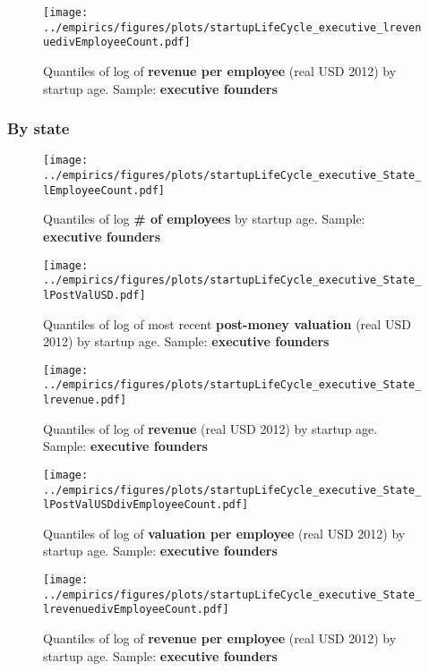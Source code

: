 \documentclass[12pt,english]{article}
\theoremstyle{remark}
\let\Oldsubsubsection\subsubsection
\renewcommand{\subsubsection}{\FloatBarrier\Oldsubsubsection}
\begin{document}
\begin{figure}[!htb]
	\centering
	\texttt{[image: ../empirics/figures/plots/startupLifeCycle\_executive\_lrevenuedivEmployeeCount.pdf]}
	\caption{Quantiles of log of \textbf{revenue per employee} (real USD 2012) by startup age. 
		Sample: \textbf{executive founders}}
\end{figure}

\subsubsection{By state}

\begin{figure}[!htb]
	\centering
	\texttt{[image: ../empirics/figures/plots/startupLifeCycle\_executive\_State\_lEmployeeCount.pdf]}
	\caption{Quantiles of log \textbf{\# of employees} by startup age. 
		Sample: \textbf{executive founders}}
\end{figure}

\begin{figure}[!htb]
	\centering
	\texttt{[image: ../empirics/figures/plots/startupLifeCycle\_executive\_State\_lPostValUSD.pdf]}
	\caption{Quantiles of log of most recent \textbf{post-money valuation} (real USD 2012) by startup age. 
		Sample: \textbf{executive founders}}
\end{figure}

\begin{figure}[!htb]
	\centering
	\texttt{[image: ../empirics/figures/plots/startupLifeCycle\_executive\_State\_lrevenue.pdf]}
	\caption{Quantiles of log of \textbf{revenue} (real USD 2012) by startup age. 
		Sample: \textbf{executive founders}}
\end{figure}

\begin{figure}[!htb]
	\centering
	\texttt{[image: ../empirics/figures/plots/startupLifeCycle\_executive\_State\_lPostValUSDdivEmployeeCount.pdf]}
	\caption{Quantiles of log of \textbf{valuation per employee} (real USD 2012) by startup age. 
		Sample: \textbf{executive founders}}
\end{figure}

\begin{figure}[!htb]
	\centering
	\texttt{[image: ../empirics/figures/plots/startupLifeCycle\_executive\_State\_lrevenuedivEmployeeCount.pdf]}
	\caption{Quantiles of log of \textbf{revenue per employee} (real USD 2012) by startup age. 
		Sample: \textbf{executive founders}}
\end{figure}
\end{document}

